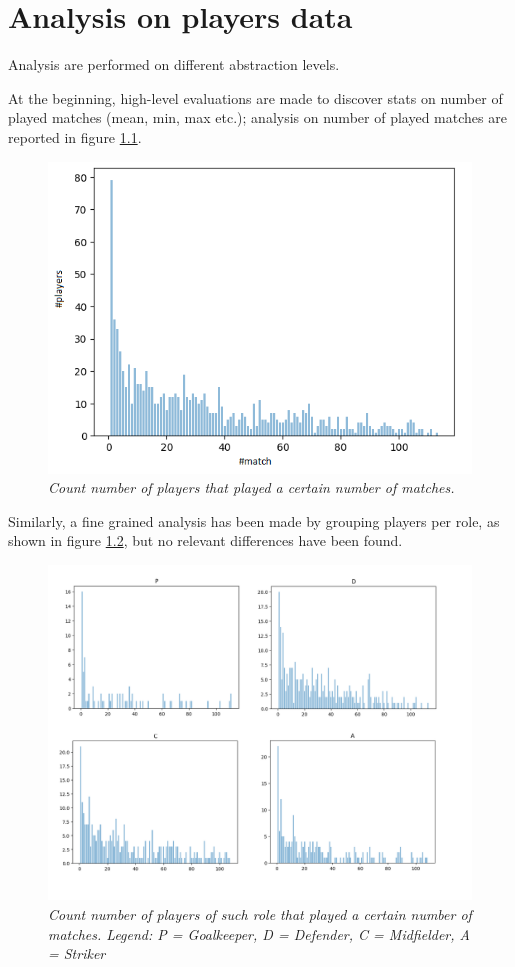 \chapter {Analysis on players data}

Analysis are performed on different abstraction levels.

At the beginning, high-level evaluations are made to discover stats on number of played matches (mean, min, max etc.); analysis on number of played matches are reported in figure \ref{fig:countMatch}.
\\
\begin{figure}[H]
  \includegraphics[scale=0.9]{images/img-01.png}
   \caption{\textit{Count number of players that played a certain number of matches.}}
  \label{fig:countMatch}
\end{figure}

Similarly, a fine grained analysis has been made by grouping players per role, as shown in figure \ref{fig:countMatchPerRole}, but no relevant differences have been found.

\begin{figure}[H]
  \includegraphics[scale=0.4]{images/img-02.png}
   \caption{\textit{Count number of players of such role that played a certain number of matches.
   Legend: P = Goalkeeper, D = Defender, C = Midfielder, A = Striker}}
  \label{fig:countMatchPerRole}
\end{figure}

